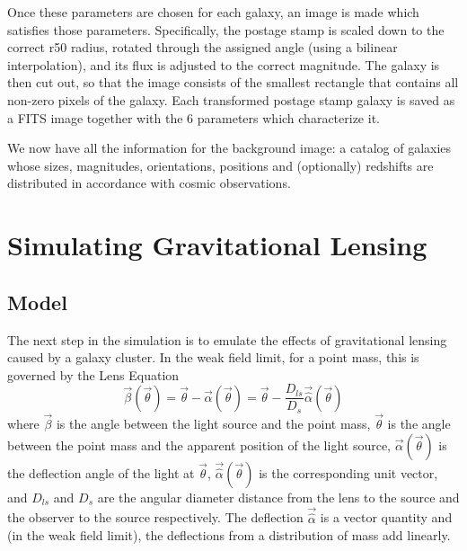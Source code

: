\documentclass[10pt,twoside]{article}
\theoremstyle{definition}
\theoremstyle{exercise}
\begin{document}
Once these parameters are chosen for each galaxy, an image is made which satisfies those parameters. Specifically, the postage stamp is scaled down to the correct r50 radius, rotated through the assigned angle (using a bilinear interpolation), and its flux is adjusted to the correct magnitude. The galaxy is then cut out, so that the image consists of the smallest rectangle that contains all non-zero pixels of the galaxy. Each transformed postage stamp galaxy is saved as a FITS image together with the 6 parameters which characterize it.

We now have all the information for the background image: a catalog of galaxies whose sizes, magnitudes, orientations, positions and (optionally) redshifts are distributed in accordance with cosmic observations.

\section{Simulating Gravitational Lensing}

\subsection{Model}
The next step in the simulation is to emulate the effects of gravitational lensing caused by a galaxy cluster. In the weak field limit, for a point mass, this is governed by the Lens Equation
\begin{equation}
  \vec{\beta}(\vec{\theta}) = \vec{\theta} - \vec{\alpha}(\vec{\theta}) = \vec{\theta} - \frac{D_{ls}}{D_s}\vec{\hat{\alpha}}(\vec{\theta})
  \label{eq:lensing}
\end{equation}
where $\vec{\beta}$ is the angle between the light source and the point mass, $\vec{\theta}$ is the angle between the point mass and the apparent position of the light source, $\vec{\alpha}(\vec{\theta})$ is the deflection angle of the light at $\vec{\theta}$, $\vec{\hat{\alpha}}(\vec{\theta})$ is the corresponding unit vector, and $D_{ls}$ and $D_s$ are the angular diameter distance from the lens to the source and the observer to the source respectively. The deflection $\vec{\hat{\alpha}}$ is a vector quantity and (in the weak field limit), the deflections from a distribution of mass add linearly.
\end{document}
